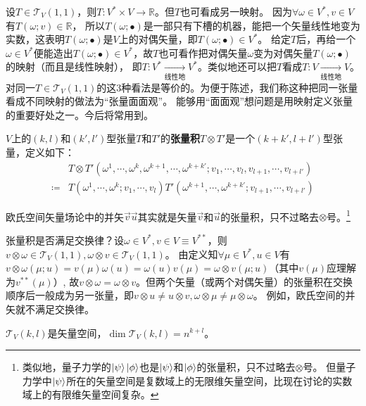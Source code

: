 设$T \in \mathscr{T}_V(1, 1)$，则$T \colon V^* \times V \to \mathbb{R}$。但$T$也可看成另一映射。
因为$\forall \omega \in V^*, v \in V$有$T(\omega; v) \in \mathbb{R}$，
所以$T(\omega; \bullet)$是一部只有下槽的机器，能把一个矢量线性地变为实数，这表明$T(\omega; \bullet)$是$V$上的对偶矢量，即$T(\omega; \bullet) \in V^*$。
给定$T$后，再给一个$\omega \in V^*$便能造出$T(\omega; \bullet) \in V^*$，故$T$也可看作把对偶矢量$\omega$变为对偶矢量$T(\omega; \bullet)$的映射（而且是线性映射），
即$T \colon V^* \xrightarrow[\text{线性地}]{} V^*$。类似地还可以把$T$看成$T \colon V \xrightarrow[\text{线性地}]{} V$。
对同一$T \in \mathscr{T}_V(1, 1)$的这$3$种看法是等价的。为便于陈述，我们称这种把同一张量看成不同映射的做法为``张量面面观''。
能够用``面面观''想问题是用映射定义张量的重要好处之一。今后将常用到。

\begin{definition}
$V$上的$(k, l)$和$(k', l')$型张量$T$和$T'$的\textbf{张量积}$T \otimes T'$是一个$(k + k', l + l')$型张量，定义如下：
$$\begin{aligned}
& T \otimes T'(\omega^1, \cdots, \omega^k, \omega^{k + 1}, \cdots, \omega^{k + k'}; v_1, \cdots, v_l, v_{l + 1}, \cdots, v_{l + l'}) \\
\coloneq & T(\omega^1, \cdots, \omega^k; v_1, \cdots, v_l)T'(\omega^{k + 1}, \cdots, \omega^{k + k'}; v_{l + 1}, \cdots, v_{l + l'})
\end{aligned}$$
\end{definition}

欧氏空间矢量场论中的并矢$\vec{v}\vec{u}$其实就是矢量$\vec{v}$和$\vec{u}$的张量积，只不过略去$\otimes$号。\footnote{
类似地，量子力学的$\ket{\psi}\ket{\phi}$也是$\ket{\psi}$和$\ket{\phi}$的张量积，只不过略去$\otimes$号。
但量子力学中$\ket{\psi}$所在的矢量空间是复数域上的无限维矢量空间，比现在讨论的实数域上的有限维矢量空间复杂。
}

张量积是否满足交换律？设$\omega \in V^*, v \in V \equiv V^{**}$，则$v \otimes \omega \in \mathscr{T}_V(1, 1), \omega \otimes v \in \mathscr{T}_V(1, 1)$。
由定义知$\forall \mu \in V^*, u \in V$有$v \otimes \omega(\mu; u) = v(\mu)\omega(u) = \omega(u)v(\mu) = \omega \otimes v(\mu; u)$（其中$v(\mu)$应理解为$v^{**}(\mu)$）,
故$v \otimes \omega = \omega \otimes v$。但两个矢量（或两个对偶矢量）的张量积在交换顺序后一般成为另一张量，即$v \otimes u \neq u \otimes v, \omega \otimes \mu \neq \mu \otimes \omega$。
例如，欧氏空间的并矢就不满足交换律。

\begin{theorem}
$\mathscr{T}_V(k, l)$是矢量空间，$\dim\mathscr{T}_V(k, l) = n^{k + l}$。
\end{theorem}

